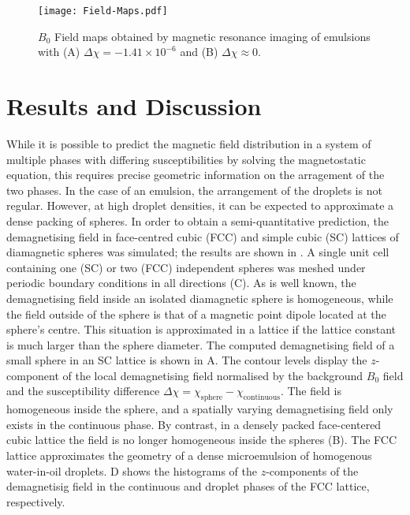 \begin{figure}
  \begin{center}
    \texttt{[image: Field-Maps.pdf]}
  \end{center}
  \caption{$B_0$ Field maps obtained by magnetic resonance imaging of emulsions
  with (A) $\Delta\chi=-1.41\times 10^{-6}$ and (B) $\Delta\chi\approx 0$.
  }
  \label{fig:field-map}
\end{figure}




\section{Results and Discussion}


While it is possible to predict the magnetic field distribution in a system of
multiple phases with differing susceptibilities by solving the magnetostatic
equation, this requires precise geometric information on the arragement of the
two phases. In the case of an emulsion, the arrangement of the droplets is not
regular. However, at high droplet densities, it can be
expected to approximate  a dense packing of spheres. In order to obtain a
semi-quantitative prediction, the demagnetising field in
face-centred cubic  (FCC) and simple cubic (SC) lattices of diamagnetic spheres was simulated;
the results are shown in  . A single unit cell containing
one (SC) or
two (FCC) independent spheres was meshed under periodic boundary conditions in all
directions (C).
As is well known, the demagnetising field inside an isolated diamagnetic sphere
is homogeneous, while the field outside of the
sphere is that of a magnetic
point dipole located at the sphere's centre. This situation is approximated
in a lattice if the lattice constant is much larger than the sphere
diameter. The computed demagnetising field
of a small sphere in an SC lattice is shown in A.
The contour levels display the $z$-component of the local demagnetising field
normalised by the background $B_0$ field and the susceptibility difference
$\Delta\chi= \chi_\text{sphere}-\chi_\text{continuous}$. The field is homogeneous
inside the sphere, and a spatially varying demagnetising field only
exists in the continuous phase.
By contrast, in a
densely packed face-centered cubic lattice the field is no
longer homogeneous inside the spheres (B). The FCC
lattice approximates the geometry of a dense microemulsion of homogenous
water-in-oil droplets.  D shows the histograms of
the $z$-components of
the demagnetisig field in the continuous and droplet phases of the FCC
lattice, respectively.


